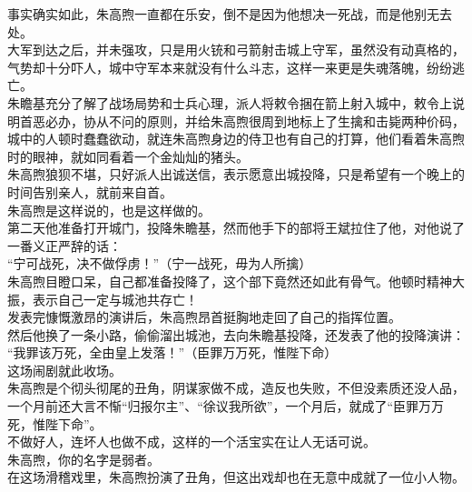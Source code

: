 \begin{multicols}{\theparacolNo}
事实确实如此，朱高煦一直都在乐安，倒不是因为他想决一死战，而是他别无去处。\\

大军到达之后，并未强攻，只是用火铳和弓箭射击城上守军，虽然没有动真格的，气势却十分吓人，城中守军本来就没有什么斗志，这样一来更是失魂落魄，纷纷逃亡。\\

朱瞻基充分了解了战场局势和士兵心理，派人将敕令捆在箭上射入城中，敕令上说明首恶必办，协从不问的原则，并给朱高煦很周到地标上了生擒和击毙两种价码，城中的人顿时蠢蠢欲动，就连朱高煦身边的侍卫也有自己的打算，他们看着朱高煦时的眼神，就如同看着一个金灿灿的猪头。\\

朱高煦狼狈不堪，只好派人出诚送信，表示愿意出城投降，只是希望有一个晚上的时间告别亲人，就前来自首。\\

朱高煦是这样说的，也是这样做的。\\

第二天他准备打开城门，投降朱瞻基，然而他手下的部将王斌拉住了他，对他说了一番义正严辞的话：\\

“宁可战死，决不做俘虏！”（宁一战死，毋为人所擒）\\

朱高煦目瞪口呆，自己都准备投降了，这个部下竟然还如此有骨气。他顿时精神大振，表示自己一定与城池共存亡！\\

发表完慷慨激昂的演讲后，朱高煦昂首挺胸地走回了自己的指挥位置。\\

然后他换了一条小路，偷偷溜出城池，去向朱瞻基投降，还发表了他的投降演讲：\\

“我罪该万死，全由皇上发落！”（臣罪万万死，惟陛下命）\\

这场闹剧就此收场。\\

朱高煦是个彻头彻尾的丑角，阴谋家做不成，造反也失败，不但没素质还没人品，一个月前还大言不惭“归报尔主”、“徐议我所欲”，一个月后，就成了“臣罪万万死，惟陛下命”。\\

不做好人，连坏人也做不成，这样的一个活宝实在让人无话可说。\\

朱高煦，你的名字是弱者。\\

在这场滑稽戏里，朱高煦扮演了丑角，但这出戏却也在无意中成就了一位小人物。\\


\end{multicols}
